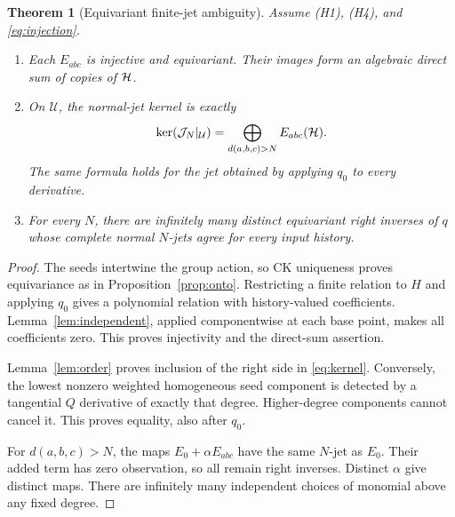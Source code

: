 \documentclass[11pt]{article}
\newtheorem{theorem}{Theorem}[section]
\theoremstyle{definition}\newtheorem{definition}[theorem]{Definition}
\theoremstyle{remark}\newtheorem{remark}[theorem]{Remark}
\DeclareMathOperator{\Ker}{ker}
\begin{document}
\begin{theorem}[Equivariant finite-jet ambiguity]\label{thm:ambiguity}
Assume (H1), (H4), and \eqref{eq:injection}.
\begin{enumerate}
\item Each $E_{abc}$ is injective and equivariant. Their images form an algebraic direct sum of copies of $\mathcal H$.
\item On $\mathcal U$, the normal-jet kernel is exactly
\begin{equation}\label{eq:kernel}
 \Ker(\Jet_N|_{\mathcal U})=
 \bigoplus_{d(a,b,c)>N} E_{abc}(\Hobs).
\end{equation}
The same formula holds for the jet obtained by applying $q_0$ to every derivative.
\item For every $N$, there are infinitely many distinct equivariant right inverses of $q$ whose complete normal $N$-jets agree for every input history.
\end{enumerate}
\end{theorem}
\begin{proof}
The seeds intertwine the group action, so CK uniqueness proves equivariance as in Proposition~\ref{prop:onto}. Restricting a finite relation to $H$ and applying $q_0$ gives a polynomial relation with history-valued coefficients. Lemma~\ref{lem:independent}, applied componentwise at each base point, makes all coefficients zero. This proves injectivity and the direct-sum assertion.

Lemma~\ref{lem:order} proves inclusion of the right side in \eqref{eq:kernel}. Conversely, the lowest nonzero weighted homogeneous seed component is detected by a tangential $Q$ derivative of exactly that degree. Higher-degree components cannot cancel it. This proves equality, also after $q_0$.

For $d(a,b,c)>N$, the maps $E_0+\alpha E_{abc}$ have the same $N$-jet as $E_0$. Their added term has zero observation, so all remain right inverses. Distinct $\alpha$ give distinct maps. There are infinitely many independent choices of monomial above any fixed degree.
\end{proof}
\end{document}
